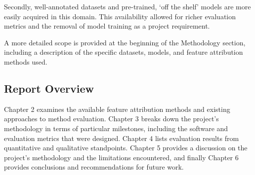 \documentclass[main]{subfiles}
\begin{document}
Secondly, well-annotated datasets and pre-trained, `off the shelf' models are more easily acquired in this domain. This availability allowed for richer evaluation metrics and the removal of model training as a project requirement.

A more detailed scope is provided at the beginning of the Methodology section, including a description of the specific datasets, models, and feature attribution methods used.


\subsection*{Report Overview}

Chapter 2 examines the available feature attribution methods and existing approaches to method evaluation. Chapter 3 breaks down the project's methodology in terms of particular milestones, including the software and evaluation metrics that were designed. Chapter 4 lists evaluation results from quantitative and qualitative standpoints. Chapter 5 provides a discussion on the project's methodology and the limitations encountered, and finally Chapter 6 provides conclusions and recommendations for future work. 
\end{document}
